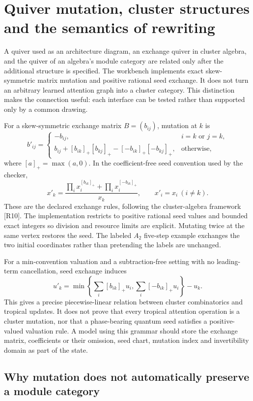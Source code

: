 \section{Quiver mutation, cluster structures and the semantics of rewriting}
\label{sec:wb-cluster-language}

A quiver used as an architecture diagram, an exchange quiver in cluster algebra, and the quiver of an algebra's module category are related only after the additional structure is specified. The workbench implements exact skew-symmetric matrix mutation and positive rational seed exchange. It does not turn an arbitrary learned attention graph into a cluster category. This distinction makes the connection useful: each interface can be tested rather than supported only by a common drawing.

For a skew-symmetric exchange matrix $B=(b_{ij})$, mutation at $k$ is
\[
 b'_{ij}=\begin{cases}
 -b_{ij},&i=k\text{ or }j=k,\\
 b_{ij}+[b_{ik}]_+[b_{kj}]_+-[-b_{ik}]_+[-b_{kj}]_+,&\text{otherwise},
 \end{cases}
\]
where $[a]_+=\max(a,0)$. In the coefficient-free seed convention used by the checker,
\[
 x'_k=\frac{\prod_i x_i^{[b_{ik}]_+}+\prod_i x_i^{[-b_{ik}]_+}}{x_k},
 \qquad x'_i=x_i\ (i\ne k).
\]
These are the declared exchange rules, following the cluster-algebra framework [R10]. The implementation restricts to positive rational seed values and bounded exact integers so division and resource limits are explicit. Mutating twice at the same vertex restores the seed. The labeled $A_2$ five-step example exchanges the two initial coordinates rather than pretending the labels are unchanged.

For a min-convention valuation and a subtraction-free setting with no leading-term cancellation, seed exchange induces
\[
 u'_k=\min\left\{\sum_i[b_{ik}]_+u_i,\sum_i[-b_{ik}]_+u_i\right\}-u_k.
\]
This gives a precise piecewise-linear relation between cluster combinatorics and tropical updates. It does not prove that every tropical attention operation is a cluster mutation, nor that a phase-bearing quantum seed satisfies a positive-valued valuation rule. A model using this grammar should store the exchange matrix, coefficients or their omission, seed chart, mutation index and invertibility domain as part of the state.

\subsection{Why mutation does not automatically preserve a module category}

